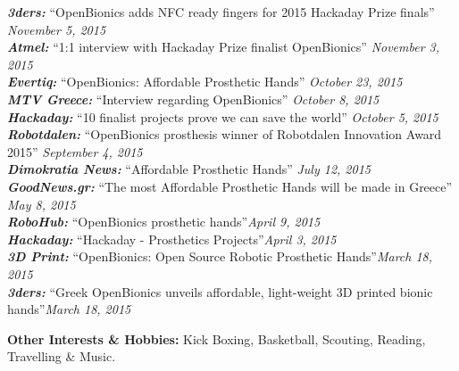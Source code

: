 \documentclass[11pt]{res} %
\begin{document}
\begin{resume}
\vspace{4pt} %
{\it\small\textbf{3ders:}} ``OpenBionics adds NFC ready fingers for 2015 Hackaday Prize finals'' \hfill{\it November 5, 2015}
\\{\it\small\textbf{Atmel:}} ``1:1 interview with Hackaday Prize finalist OpenBionics'' \hfill{\it November 3, 2015}
\\{\it\small\textbf{Evertiq:}} ``OpenBionics: Affordable Prosthetic Hands'' \hfill{\it October 23, 2015}
\\{\it\small\textbf{MTV Greece:}} ``Interview regarding OpenBionics'' \hfill{\it October 8, 2015}
\\{\it\small\textbf{Hackaday:}} ``10 finalist projects prove we can save the world'' \hfill{\it October 5, 2015}
\\{\it\small\textbf{Robotdalen:}} ``OpenBionics prosthesis winner of Robotdalen Innovation Award 2015'' \hfill{\it September 4, 2015}
\\{\it\small\textbf{Dimokratia News:}} ``Affordable Prosthetic Hands'' \hfill{\it July 12, 2015}
\\{\it\small\textbf{GoodNews.gr:}} ``The most Affordable Prosthetic Hands will be made in Greece'' \hfill{\it May 8, 2015}
\\{\it\small\textbf{RoboHub:}} ``OpenBionics prosthetic hands''\hfill{\it April 9, 2015}
\\{\it\small\textbf{Hackaday:}} ``Hackaday - Prosthetics Projects''\hfill{\it April 3, 2015}
\\{\it\small\textbf{3D Print:}} ``OpenBionics: Open Source Robotic Prosthetic Hands''\hfill{\it March 18, 2015}
\\{\it\small\textbf{3ders:}} ``Greek OpenBionics unveils affordable, light-weight 3D printed bionic hands''\hfill{\it March 18, 2015}\\

\vspace{0.1in} %

\textbf{Other Interests \& Hobbies:} Kick Boxing, Basketball, Scouting, Reading, Travelling \& Music.

\end{resume} 
\end{document}
